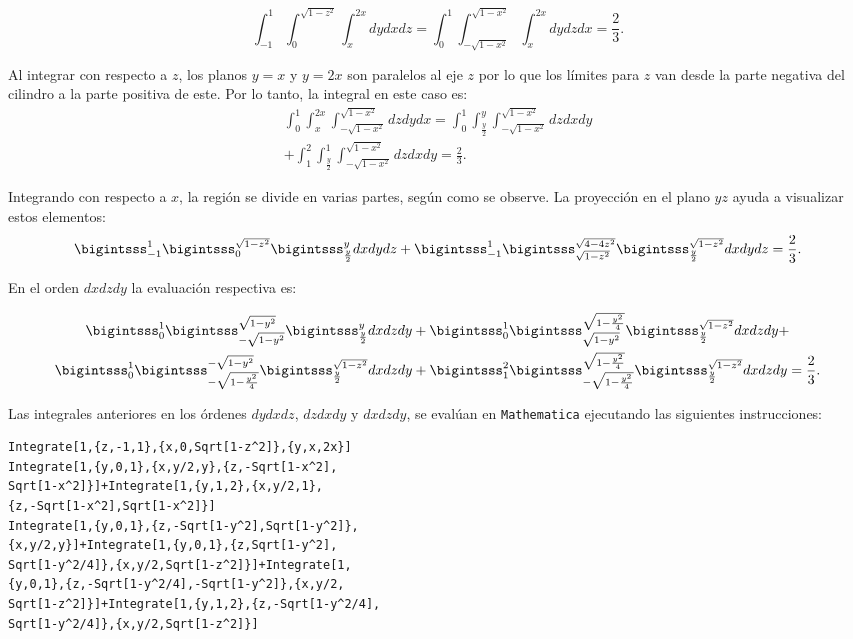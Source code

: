 \[\int_{-1}^{1}\int_{0}^{\sqrt{1-z^{2}}}\int_{x}^{2x}dydxdz= \int_{0}^{1}\int_{-\sqrt{1-x^{2}}}^{\sqrt{1-x^{2}}}\int_{x}^{2x}dydzdx= \frac{2}{3}.\]

Al integrar con respecto a $z$, los planos $y=x$ y $y=2x$ son paralelos al eje $z$ por lo que los límites para $z$ van desde la parte negativa del cilindro a la parte positiva de este. Por lo tanto, la integral en este caso es:
\begin{multline*} \int_{0}^{1}\int_{x}^{2x}\int_{-\sqrt{1-x^{2}}}^{\sqrt{1-x^{2}}}dzdydx= \int_{0}^{1}\int_{\frac{y}{2}}^{y}\int_{-\sqrt{1-x^{2}}}^{\sqrt{1-x^{2}}}dzdxdy \\ +\int_{1}^2\int_{\frac{y}{2}}^{1}\int_{-\sqrt{1-x^{2}}}^{\sqrt{1-x^{2}}}dzdxdy= \frac{2}{3}.
\end{multline*}

Integrando con respecto a $x$, la región se divide en varias partes, según como se observe. La proyección en el plano $yz$ ayuda a visualizar estos elementos:
{\small
\[\bigintsss_{-1}^{1}\bigintsss_{0}^{\sqrt{1-z^{2}}}\bigintsss_{\frac{y}{2}}^{y}dxdydz+\bigintsss_{-1}^{1}\bigintsss_{\sqrt{1-z^{2}}}^{\sqrt{4-4z^{2}}}\bigintsss_{\frac{y}{2}}^{\sqrt{1-z^{2}}}dxdydz= \frac{2}{3}.\]
}

En el orden $dxdzdy$ la evaluación respectiva es:

{\small
\begin{multline*}
\bigintsss_{0}^{1}\bigintsss_{-\sqrt{1-y^{2}}}^{\sqrt{1-y^{2}}}\bigintsss_{\frac{y}{2}}^{y}dxdzdy+\bigintsss_{0}^{1}\bigintsss_{\sqrt{1-y^{2}}}^{\sqrt{1-\frac{y^{2}}{4}}}\bigintsss_{\frac{y}{2}}^{\sqrt{1-z^{2}}}dxdzdy +\\
\bigintsss_{0}^{1}\bigintsss_{-\sqrt{1-\frac{y^{2}}{4}}}^{-\sqrt{1-y^{2}}}\bigintsss_{\frac{y}{2}}^{\sqrt{1-z^{2}}}dxdzdy+\bigintsss_{1}^2\bigintsss_{-\sqrt{1-\frac{y^{2}}{4}}}^{\sqrt{1-\frac{y^{2}}{4}}}\bigintsss_{\frac{y}{2}}^{\sqrt{1-z^{2}}}dxdzdy= \frac{2}{3}.
\end{multline*}
}

Las integrales anteriores en los órdenes $dydxdz$, $dzdxdy$ y $dxdzdy$, se evalúan en \verb"Mathematica"
ejecutando las siguientes instrucciones:

\begin{tcolorbox}[title=\bf Instrucción en \verb"Mathematica"]\begin{Verbatim}[formatcom=\letraverbatim]
Integrate[1,{z,-1,1},{x,0,Sqrt[1-z^2]},{y,x,2x}]
Integrate[1,{y,0,1},{x,y/2,y},{z,-Sqrt[1-x^2],
Sqrt[1-x^2]}]+Integrate[1,{y,1,2},{x,y/2,1},
{z,-Sqrt[1-x^2],Sqrt[1-x^2]}]
Integrate[1,{y,0,1},{z,-Sqrt[1-y^2],Sqrt[1-y^2]},
{x,y/2,y}]+Integrate[1,{y,0,1},{z,Sqrt[1-y^2],
Sqrt[1-y^2/4]},{x,y/2,Sqrt[1-z^2]}]+Integrate[1,
{y,0,1},{z,-Sqrt[1-y^2/4],-Sqrt[1-y^2]},{x,y/2,
Sqrt[1-z^2]}]+Integrate[1,{y,1,2},{z,-Sqrt[1-y^2/4],
Sqrt[1-y^2/4]},{x,y/2,Sqrt[1-z^2]}]
\end{Verbatim}
\end{tcolorbox}

